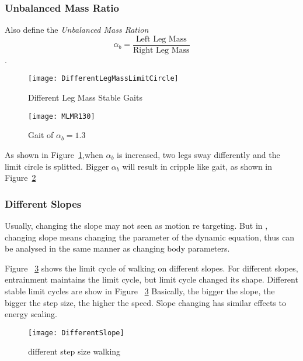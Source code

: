 \subsubsection*{Unbalanced Mass Ratio}
Also define the \emph{Unbalanced Mass Ration} 
\[
\alpha_b=\frac{\text{Left Leg Mass}}{\text{Right Leg Mass}}
\].


\begin{figure}[!htbp]
  \begin{center}
      \texttt{[image: DifferentLegMassLimitCircle]}
    \caption{Different Leg Mass Stable Gaits}
    \label{fig:differentlr}
\end{center}
\end{figure}




\begin{figure}[!htbp]
  \begin{center}
      \texttt{[image: MLMR130]}
    \caption{Gait of $\alpha_b=1.3$}
    \label{fig:lm2}
\end{center}
\end{figure}
As shown in Figure~\ref{fig:differentlr},when $\alpha_b$ is increased, two legs sway differently and the limit circle is splitted.
Bigger $\alpha_b$  will result in cripple like gait, as shown in Figure~\ref{fig:lm2}



\subsubsection*{Different Slopes}
Usually, changing the slope may not seen as motion re targeting.
But in \moit, changing slope means changing the parameter of the dynamic equation, thus can be analysed in the same manner as changing body parameters.


Figure ~\ref{fig:diffslopes} shows the limit cycle of walking on different slopes.
For different slopes, entrainment maintains the limit cycle, but limit cycle changed its shape.
Different stable limit cycles are show in Figure ~\ref{fig:diffslopes}
Basically, the bigger the slope, the bigger the step size, the higher the speed.
Slope changing has similar effects to energy scaling.



\begin{figure}[!htbp]
  \begin{center}
      \texttt{[image: DifferentSlope]}
    \caption{different step size walking}
    \label{fig:diffslopes}
\end{center}
\end{figure}

